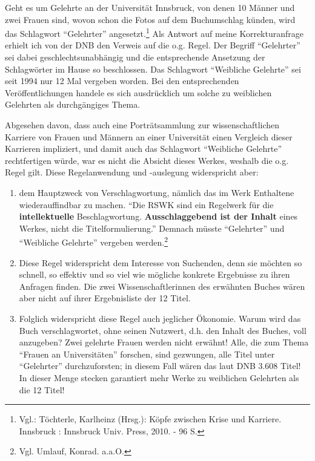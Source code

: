 \documentclass[a4paper,
fontsize=11pt,
oneside,
numbers=noperiodatend,
parskip=half-,
bibliography=totoc,
final
]{scrartcl}
\begin{document}
Geht es um Gelehrte an der Universität Innsbruck, von denen 10 Männer
und zwei Frauen sind, wovon schon die Fotos auf dem Buchumschlag künden,
wird das Schlagwort \enquote{Gelehrter} angesetzt.\footnote{Vgl.:
  Töchterle, Karlheinz (Hrsg.): Köpfe zwischen Krise und Karriere.
  Innsbruck : Innsbruck Univ. Press, 2010. - 96 S.} Als Antwort auf
meine Korrekturanfrage erhielt ich von der DNB den Verweis auf die o.g.
Regel. Der Begriff \enquote{Gelehrter} sei dabei geschlechtsunabhängig
und die entsprechende Ansetzung der Schlagwörter im Hause so
beschlossen. Das Schlagwort \enquote{Weibliche Gelehrte} sei seit 1994
nur 12 Mal vergeben worden. Bei den entsprechenden Veröffentlichungen
handele es sich ausdrücklich um solche zu weiblichen Gelehrten als
durchgängiges Thema.

Abgesehen davon, dass auch eine Porträtsammlung zur wissenschaftlichen
Karriere von Frauen und Männern an einer Universität einen Vergleich
dieser Karrieren impliziert, und damit auch das Schlagwort
\enquote{Weibliche Gelehrte} rechtfertigen würde, war es nicht die
Absicht dieses Werkes, weshalb die o.g. Regel gilt. Diese Regelanwendung
und -auslegung widerspricht aber:

\begin{enumerate}
\def\labelenumi{(\alph{enumi})}
\item
  dem Hauptzweck von Verschlagwortung, nämlich das im Werk Enthaltene
  wiederauffindbar zu machen. \enquote{Die RSWK sind ein Regelwerk für
  die \textbf{intellektuelle} Beschlagwortung. \textbf{Ausschlaggebend
  ist der Inhalt} eines Werkes, nicht die Titelformulierung.} Demnach
  müsste \enquote{Gelehrter} und \enquote{Weibliche Gelehrte} vergeben
  werden.\footnote{Vgl. Umlauf, Konrad. a.a.O.}
\item
  Diese Regel widerspricht dem Interesse von Suchenden, denn sie möchten
  so schnell, so effektiv und so viel wie mögliche konkrete Ergebnisse
  zu ihren Anfragen finden. Die zwei Wissenschaftlerinnen des erwähnten
  Buches wären aber nicht auf ihrer Ergebnisliste der 12 Titel.
\item
  Folglich widerspricht diese Regel auch jeglicher Ökonomie. Warum wird
  das Buch verschlagwortet, ohne seinen Nutzwert, d.h. den Inhalt des
  Buches, voll anzugeben? Zwei gelehrte Frauen werden nicht erwähnt!
  Alle, die zum Thema \enquote{Frauen an Universitäten} forschen, sind
  gezwungen, alle Titel unter \enquote{Gelehrter} durchzuforsten; in
  diesem Fall wären das laut DNB 3.608 Titel! In dieser Menge stecken
  garantiert mehr Werke zu weiblichen Gelehrten als die 12 Titel!
\end{enumerate}
\end{document}
